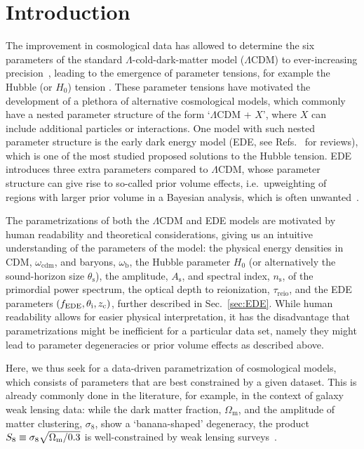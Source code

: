 \documentclass[aps, prd, reprint, superscriptaddress, nofootinbib, bibnotes]{revtex4-2}
\newcommand{\EDE}{\mathrm{EDE}}
\begin{document}
\maketitle


\section{Introduction}
\label{sec:intro}

The improvement in cosmological data has allowed to determine the six parameters of the standard $\Lambda$-cold-dark-matter model ($\Lambda$CDM) to ever-increasing precision~\cite{Komatsu:2014ioa, Planck:2018vyg}, leading to the emergence of parameter tensions, for example the Hubble (or $H_0$) tension \citep[e.g.][]{Planck:2018vyg, Riess:2021jrx}. These parameter tensions have motivated the development of a plethora of alternative cosmological models, which commonly have a nested parameter structure of the form `$\Lambda$CDM + $X$', where $X$ can include additional particles or interactions. 
One model with such nested parameter structure is the early dark energy model (EDE, see Refs.~\cite{Kamionkowski:2022pkx, Poulin:2023lkg} for reviews), which is one of the most studied proposed solutions to the Hubble tension. EDE introduces three extra parameters compared to $\Lambda$CDM, whose parameter structure can give rise to so-called prior volume effects, i.e.\ upweighting of regions with larger prior volume in a Bayesian analysis, which is often unwanted~\cite{Murgia:2020ryi, Smith:2020rxx, Niedermann:2020dwg, Herold:2021ksg}. 

The parametrizations of both the $\Lambda$CDM and EDE models are motivated by human readability and theoretical considerations, giving us an intuitive understanding of the parameters of the model: the physical energy densities in CDM, $\omega_\mathrm{cdm}$, and baryons, $\omega_\mathrm{b}$, the Hubble parameter $H_0$ (or alternatively the sound-horizon size $\theta_\mathrm{s}$), the amplitude, $A_{\mathrm{s}}$, and spectral index, $n_{\mathrm{s}}$, of the primordial power spectrum, the optical depth to reionization, $\tau_\mathrm{reio}$, and the EDE parameters $(f_\EDE, \theta_\mathrm{i}, z_{\rm{c}})$, further described in Sec.~\ref{sec:EDE}. While human readability allows for easier physical interpretation, it has the disadvantage that parametrizations might be inefficient for a particular data set, namely they might lead to parameter degeneracies or prior volume effects as described above. 

Here, we thus seek for a data-driven parametrization of cosmological models, which consists of parameters that are best constrained by a given dataset. This is already commonly done in the literature, for example, in the context of galaxy weak lensing data: while the dark matter fraction, $\Omega_{\mathrm{m}}$, and the amplitude of matter clustering, $\sigma_8$, show a `banana-shaped' degeneracy, the product $S_8 \equiv \sigma_8\sqrt{\Omega_{\rm{m}}/0.3}$ is well-constrained by weak lensing surveys~\cite{Heymans:2020gsg, Kilo-DegreeSurvey:2023gfr, Sugiyama:2023fzm}.
\end{document}
